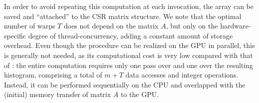 In order to avoid repeating this computation at each \spmv invocation,
the array \srow can be saved and ``attached'' to the CSR matrix structure.
We note that the optimal number of warps $T$ does not depend on the matrix $A$,
but only on the hardware-specific degree of thread-concurrency,
adding a constant amount of storage overhead.
Even though the procedure can be realized on the GPU in parallel,
this is generally not needed,
as its computational cost is very low compared with that of \spmv:
the entire computation requires only one pass over
\rowptr and one over the resulting histogram,
comprising a total of $m + T$ data accesses and integer operations.
Instead, it can be performed sequentially on the CPU
and overlapped with the (initial) memory transfer of matrix $A$ to the GPU.

